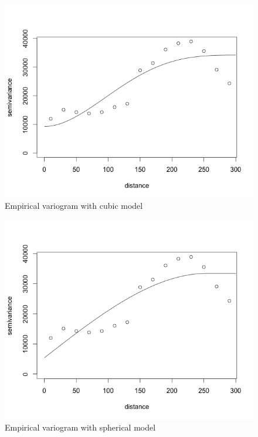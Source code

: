 \documentclass[12pt,twoside]{reedthesis}
\begin{document}
\begin{figure}[h!]
	   
	       \centering
	  
	    \includegraphics[scale=0.5]{vario_cubic}
	
	     \caption{Empirical variogram with cubic model}
	 \label{cubic}
	\end{figure}
	
\begin{figure}[h!]
	   
	       \centering
	  
	    \includegraphics[scale=0.5]{vario_spherical}
	
	     \caption{Empirical variogram with spherical model}
	 \label{sph}
	\end{figure}
	
\end{document}
